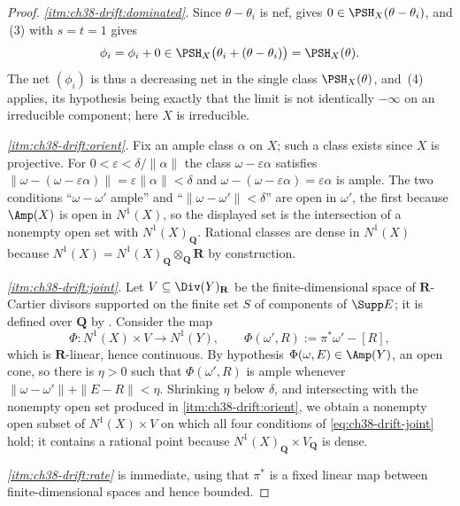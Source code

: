 \begin{proof}
\emph{\cref{itm:ch38-drift:dominated}.}  Since $\theta-\theta_i$ is nef,
 gives $0\in\PSH_X(\theta-\theta_i)$, and
\,(3) with $s=t=1$ gives
\[
 \phi_i=\phi_i+0\in\PSH_X\bigl(\theta_i+(\theta-\theta_i)\bigr)
 =\PSH_X(\theta).
\]
The net $(\phi_i)$ is thus a decreasing net in the single class
$\PSH_X(\theta)$, and \,(4) applies, its
hypothesis being exactly that the limit is not identically $-\infty$ on
an irreducible component; here $X$ is irreducible.

\emph{\cref{itm:ch38-drift:orient}.}  Fix an ample class $\alpha$ on
$X$; such a class exists since $X$ is projective.  For
$0<\varepsilon<\delta/\|\alpha\|$ the class
$\omega-\varepsilon\alpha$ satisfies
$\|\omega-(\omega-\varepsilon\alpha)\|=\varepsilon\|\alpha\|<\delta$ and
$\omega-(\omega-\varepsilon\alpha)=\varepsilon\alpha$ is ample.  The two
conditions ``$\omega-\omega'$ ample'' and
``$\|\omega-\omega'\|<\delta$'' are open in $\omega'$, the first
because $\Amp(X)$ is open in $N^1(X)$, so the displayed set is the
intersection of a nonempty open set with
$N^1(X)_{\mathbf Q}$.  Rational classes are dense in $N^1(X)$ because
$N^1(X)=N^1(X)_{\mathbf Q}\otimes_{\mathbf Q}\mathbf R$ by construction.

\emph{\cref{itm:ch38-drift:joint}.}  Let
$V\subseteq\Div(Y)_{\mathbf R}$ be the finite-dimensional space of
$\mathbf R$-Cartier divisors supported on the finite set $S$ of
components of $\Supp E$; it is defined over $\mathbf Q$ by
.  Consider the
map
\[
 \Phi:N^1(X)\times V\longrightarrow N^1(Y),
 \qquad
 \Phi(\omega',R):=\pi^*\omega'-[R],
\]
which is $\mathbf R$-linear, hence continuous.  By hypothesis
$\Phi(\omega,E)\in\Amp(Y)$, an open cone, so there is
$\eta>0$ such that $\Phi(\omega',R)$ is ample whenever
$\|\omega-\omega'\|+\|E-R\|<\eta$.  Shrinking $\eta$ below $\delta$,
and intersecting with the nonempty open set produced in
\cref{itm:ch38-drift:orient}, we obtain a nonempty open subset of
$N^1(X)\times V$ on which all four conditions of
\eqref{eq:ch38-drift-joint} hold; it contains a rational point because
$N^1(X)_{\mathbf Q}\times V_{\mathbf Q}$ is dense.

\emph{\cref{itm:ch38-drift:rate}} is immediate, using that
$\pi^*$ is a fixed linear map between finite-dimensional spaces and
hence bounded.
\end{proof}

